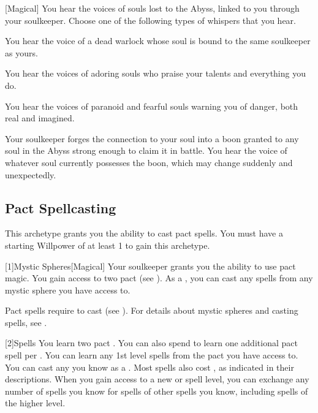        [Magical]
        You hear the voices of souls lost to the Abyss, linked to you through your soulkeeper.
        Choose one of the following types of whispers that you hear.
        {
             You hear the voice of a dead warlock whose soul is bound to the same soulkeeper as yours.


             You hear the voices of adoring souls who praise your talents and everything you do.

             You hear the voices of paranoid and fearful souls warning you of danger, both real and imagined.

             Your soulkeeper forges the connection to your soul into a boon granted to any soul in the Abyss strong enough to claim it in battle.
            You hear the voice of whatever soul currently possesses the boon, which may change suddenly and unexpectedly.
        }

    \subsection{Pact Spellcasting}
        This archetype grants you the ability to cast pact spells.
        You must have a starting Willpower of at least 1 to gain this archetype.

        [1]{Mystic Spheres}[Magical]
        Your soulkeeper grants you the ability to use pact magic.
        You gain access to two pact  (see ).
        As a , you can cast any  spells from any mystic sphere you have access to.

        Pact spells require  to cast (see ).
        For details about mystic spheres and casting spells, see .

        [2]{Spells} You learn two pact .
        You can also spend  to learn one additional pact spell per .
        You can learn any 1st level spells from the pact  you have access to.
        You can cast any  you know as a .
        Most spells also cost , as indicated in their descriptions.
        When you gain access to a new  or spell level, you can exchange any number of spells you know for spells of other spells you know, including spells of the higher level.

